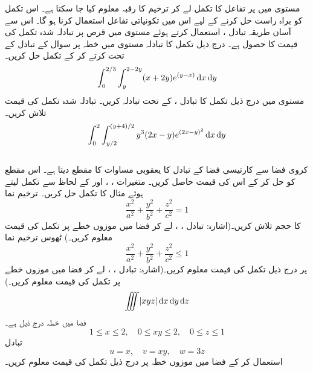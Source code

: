 مستوی  میں     پر تفاعل  کا تکمل لے کر ترخیم کا رقبہ  معلوم  کیا جا سکتا ہے۔ اس تکمل کو براہ راست  حل کرنے کے لیے اس میں تکونیاتی تفاعل   استعمال کرنا ہو گا۔ اس سے آسان طریقہ تبادل ،  استعمال کرتے ہوئے  مستوی      میں  قرص  پر   تبادلہ  شدہ تکمل کی    قیمت کا حصول ہے۔
درج ذیل تکمل کا تبادلہ  مستوی   میں خطہ  پر سوال  کے تبادل  کے تحت کرتے  کر کے تکمل حل کریں۔
\[\int_0^{2/3}\int_y^{2-2y}(x+2y)e^{(y-x)}\dif x\dif y\]
مستوی  میں درج ذیل تکمل  کا  تبادل ،   کے تحت تبادلہ کریں۔  تبادلہ  شدہ تکمل کی قیمت تلاش کریں۔
\[\int_0^2\int_{y/2}^{(y+4)/2}y^3(2x-y)e^{(2x-y)^2}\dif x\dif y\]
\\
کروی  فضا  سے کارتیسی  فضا کے تبادل کا یعقوبی مساوات  کا مقطع  دیتا ہے۔ اس مقطع  کو حل کر کے اس کی قیمت  حاصل کریں۔
متغیرات ،  ، اور  کے لحاظ سے تکمل لیتے ہوئے مثال  کا تکمل حل کریں۔
ترخیم نما 
\[\frac{x^2}{a^2}+\frac{y^2}{b^2}+\frac{z^2}{c^2}=1\]
کا حجم تلاش کریں۔(اشارہ: تبادل ، ،   لے کر فضا  میں موزوں خطے  پر تکمل  کی قیمت معلوم  کریں۔)
ٹھوس ترخیم نما 
\[\frac{x^2}{a^2}+\frac{y^2}{b^2}+\frac{z^2}{c^2}\le 1\]
پر درج ذیل تکمل کی قیمت معلوم  کریں۔(اشارہ: تبادل ، ،  لے کر فضا  میں موزوں خطے  پر تکمل  کی قیمت  معلوم کریں۔)
\[\iiint \abs{xyz}\dif x\dif y\dif z\]
فضا  میں  خطہ  درج           ذیل ہے۔
\[1\le x\le 2,\quad 0\le xy\le 2,\quad 0\le z\le 1\]
تبادل
\[u=x,\quad v=xy,\quad w=3z\]
استعمال کر کے فضا    میں موزوں خطہ   پر درج ذیل  تکمل کی قیمت معلوم  کریں۔
